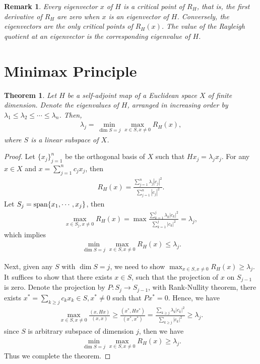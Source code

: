 \documentclass[11pt]{book}
\newtheorem{theorem}{Theorem}[section]
\newtheorem{remark}{Remark}[section]
\theoremstyle{definition}
\numberwithin{equation}{subsection}
\begin{document}
\begin{remark}
Every eigenvector $x$ of $H$ is a critical point of $R_H$, that is, the first derivative of $R_H$ are zero when $x$ is an eigenvector of $H$. Conversely, the eigenvectors are the only critical points of $R_H(x)$. The value of the Rayleigh quotient at an eigenvector is the corresponding eigenvalue of $H$.
\end{remark}

\medskip

\section{Minimax Principle}

\begin{theorem}
Let $H$ be a self-adjoint map of a Euclidean space $X$ of finite dimension. Denote the eigenvalues of $H$, arranged in increasing order by $\lambda_1 \leq \lambda_2 \leq \cdots \leq \lambda_n$. Then,
\begin{align*}
    \lambda_j = \min_{\dim S=j} \max_{x\in S, x\neq 0} R_H(x),
\end{align*}
where $S$ is a linear subspace of $X$.
\end{theorem}
\begin{proof}
Let $\{x_j\}^n_{j=1}$ be the orthogonal basis of $X$ such that $Hx_j = \lambda_j x_j$. For any $x\in X$ and $x = \sum^n_{j=1}c_j x_j$, then 
\begin{align*}
    R_H(x) = \frac{\sum^n_{j=1}\lambda_j |c_j|^2}{\sum^n_{j=1} |c_j|^2}.
\end{align*}
Let $S_j = {\rm span} \{x_1,\cdots,x_j\}$, then 
\begin{align*}
    \max_{x\in S_j, x\neq 0} R_H(x) = \max \frac{\sum^j_{k=1}\lambda_k |c_k|^2}{\sum^j_{k=1} |c_k|^2} = \lambda_j,
\end{align*}
which implies 
\begin{align*}
    \min_{\dim S=j} \max_{x\in S, x\neq 0} R_H(x) \leq \lambda_j.
\end{align*}

Next, given any $S$ with $\dim S = j$, we need to show $\max_{x\in S, x\neq 0} R_H(x) \geq \lambda_j$. It suffices to show that there exists $x\in S$, such that the projection of $x$ on $S_{j-1}$ is zero. Denote the projection by $P:S_j\to S_{j-1}$, with Rank-Nullity theorem, there exists $x^* = \sum_{k\geq j}c_k x_k \in S, x^*\neq 0$ such that $Px^* = 0$. Hence, we have
\begin{align*}
    \max_{x\in S, x\neq 0} \frac{(x,Hx)}{(x,x)} \geq \frac{(x^*, Hx^*)}{(x^*,x^*)} = \frac{\sum_{k\geq j}\lambda_k |c_k|^2}{\sum_{k\geq j} |c_k|^2} \geq \lambda_j.
\end{align*}
since $S$ is arbitrary subspace of dimension $j$, then we have
\begin{align*}
    \min_{\dim S=j} \max_{x\in S, x\neq 0} R_H(x) \geq \lambda_j.
\end{align*}
Thus we complete the theorem.
\end{proof}
\end{document}
